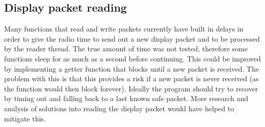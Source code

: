 \subsection*{Display packet reading}
\label{display_packet_reading}
Many functions that read and write packets currently have built in delays in order to give the radio time to send out a new display packet and to be processed by the reader thread. The true amount of time was not tested, therefore some functions sleep for as much as a second before continuing. This could be improved by implementing a getter function that blocks until a new packet is received. The problem with this is that this provides a risk if a new packet is never received (as the function would then block forever). Ideally the program should try to recover by timing out and falling back to a last known safe packet. More research and analysis of solutions into reading the display packet would have helped to mitigate this.

